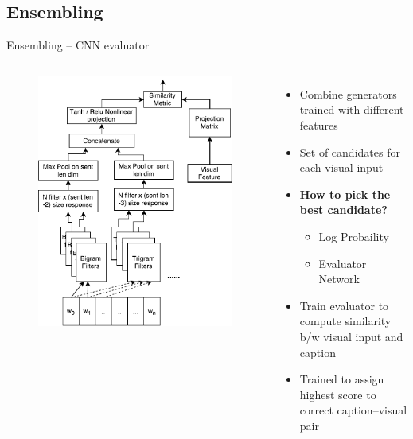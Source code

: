 \documentclass{beamer}
\begin{document}
\subsection{Ensembling}
\begin{frame}{Ensembling -- CNN evaluator}
\begin{columns}       
    \begin{figure}[h]
        \includegraphics[width=1.0\textwidth]{images/CnnEval.pdf}
        \vfill
    \end{figure}
    \begin{itemize}
        \item Combine generators trained with different features
        \item Set of candidates for each visual input 
        \item \textbf{How to pick the best candidate?} 
                \begin{itemize}
                    \item Log Probaility
                    \item Evaluator Network
                \end{itemize}
        \item Train evaluator to compute similarity b/w visual input and caption 
        \item Trained to assign highest score to correct caption--visual pair 
    \end{itemize}
\end{columns}
\end{frame}
\end{document}
